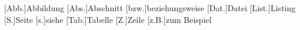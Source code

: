 
\setcounter{secnumdepth}{4}
\tableofcontents
\newpage
\listoffigures
\newpage
\listoftables
\newpage
\lstlistoflistings
{}
\newpage
{}
\begin{acronym}
[Abb.]{Abbildung}
[Abs.]{Abschnitt}
[bzw.]{beziehungsweise}
[Dat.]{Datei}
[List.]{Listing}
[S.]{Seite}
[s.]{siehe}
[Tab.]{Tabelle}
[Z.]{Zeile}
[z.B.]{zum Beispiel}
\end{acronym}
\newpage
{}